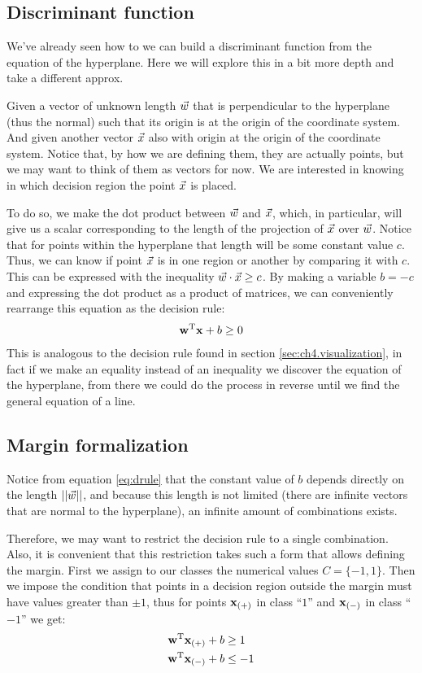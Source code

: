 \subsection{Discriminant function}

We've already seen how to we can build a discriminant function from the equation of the hyperplane. Here we will explore this in a bit more depth and take a different approx. 

Given a vector of unknown length $\vec{w}$ that is perpendicular to the hyperplane (thus the normal) such that its origin is at the origin of the coordinate system. And given another vector $\vec{x}$ also with origin at the origin of the coordinate system. Notice that, by how we are defining them, they are actually points, but we may want to think of them as vectors for now. We are interested in knowing in which decision region the point $\vec{x}$ is placed.

To do so, we make the dot product between $\vec{w}$ and $\vec{x}$, which, in particular, will give us a scalar corresponding to the length of the projection of $\vec{x}$ over $\vec{w}$. Notice that for points within the hyperplane that length will be some constant value $c$. Thus, we can know if point $\vec{x}$ is in one region or another by comparing it with $c$. This can be expressed with the inequality $\vec{w} \cdot \vec{x} \ge c$. By making a variable $b = -c$ and expressing the dot product as a product of matrices, we can conveniently rearrange this equation as the decision rule:
\begin{align}\label{eq:drule}
    \mathbf{w}^{\text{T}} \mathbf{x} + b \ge 0
\end{align}
This is analogous to the decision rule found in section \ref{sec:ch4.visualization}, in fact if we make an equality instead of an inequality we discover the equation of the hyperplane, from there we could do the process in reverse until we find the general equation of a line. 

\subsection{Margin formalization}

Notice from equation \ref{eq:drule} that the constant value of $b$ depends directly on the length $||\vec{w}||$, and because this length is not limited (there are infinite vectors that are normal to the hyperplane), an infinite amount of combinations exists.

Therefore, we may want to restrict the decision rule to a single combination. Also, it is convenient that this restriction takes such a form that allows defining the margin. First we assign to our classes the numerical values $C = \{-1, 1\}$. Then we impose the condition that points in a decision region outside the margin must have values greater than $\pm 1$, thus for points $\mathbf{x}_{(+)}$ in class “$1$” and $\mathbf{x}_{(-)}$ in class “$-1$” we get:
\begin{align*}
    \mathbf{w}^{\text{T}} \mathbf{x}_{(+)} + b &\ge 1\\
    \mathbf{w}^{\text{T}} \mathbf{x}_{(-)} + b &\le -1
\end{align*}

